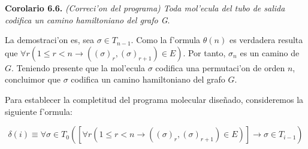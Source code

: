 \documentclass[12pt]{article}
\begin{document}
\textbf{Corolario 6.6.} \textit{(Correci'on del programa) Toda mol'ecula del tubo de salida codifica un camino hamiltoniano
del grafo G}.

La demostraci'on es, sea $\sigma \in T_{n-1}$. Como la f'ormula $\theta(n)$ es verdadera resulta que
$\forall r (1 \leq r < n \to ((\sigma)_{r},(\sigma)_{r+1}) \in E)$. Por tanto, $\sigma_{n}$ es un camino de $G$.
Teniendo presente que la mol'ecula $\sigma$ codifica una permutaci'on de orden $n$, concluimor que $\sigma$ codifica
un camino hamiltoniano del grafo $G$.

Para establecer la completitud del programa molecular diseñado, consideremos la siguiente f'ormula:

\begin{equation*}
  \delta(i) \equiv \forall \sigma \in T_{0} ([\forall r (1 \leq r < n \to ((\sigma)_{r},(\sigma)_{r+1})
   \in E)] \to \sigma \in T_{i-1})
\end{equation*}

\printbibliography
\end{document}
